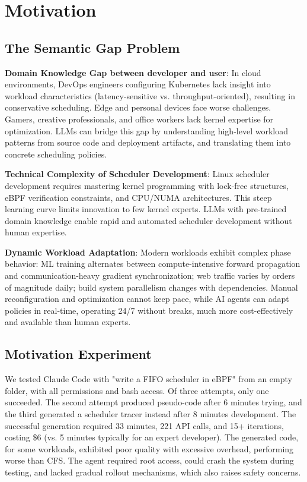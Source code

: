 \section{Motivation}
\label{sec:motivation}

\subsection{The Semantic Gap Problem}

\textbf{Domain Knowledge Gap between developer and user}: In cloud environments, DevOps engineers configuring Kubernetes lack insight into workload characteristics (latency-sensitive vs. throughput-oriented), resulting in conservative scheduling. Edge and personal devices face worse challenges. Gamers, creative professionals, and office workers lack kernel expertise for optimization. LLMs can bridge this gap by understanding high-level workload patterns from source code and deployment artifacts, and translating them into concrete scheduling policies.

\textbf{Technical Complexity of Scheduler Development}: Linux scheduler development requires mastering kernel programming with lock-free structures, eBPF verification constraints, and CPU/NUMA architectures. This steep learning curve limits innovation to few kernel experts. LLMs with pre-trained domain knowledge enable rapid and automated scheduler development without human expertise.

\textbf{Dynamic Workload Adaptation}: Modern workloads exhibit complex phase behavior: ML training alternates between compute-intensive forward propagation and communication-heavy gradient synchronization; web traffic varies by orders of magnitude daily; build system parallelism changes with dependencies. Manual reconfiguration and optimization cannot keep pace, while AI agents can adapt policies in real-time, operating 24/7 without breaks, much more cost-effectively and available than human experts.

\subsection{Motivation Experiment}

We tested Claude Code with "write a FIFO scheduler in eBPF" from an empty folder, with all permissions and bash access. Of three attempts, only one succeeded. The second attempt produced pseudo-code after 6 minutes trying, and the third generated a scheduler tracer instead after 8 minutes development. The successful generation required 33 minutes, 221 API calls, and 15+ iterations, costing \$6 (vs. 5 minutes typically for an expert developer). The generated code, for some workloads, exhibited poor quality with excessive overhead, performing worse than CFS. The agent required root access, could crash the system during testing, and lacked gradual rollout mechanisms, which also raises safety concerns.

